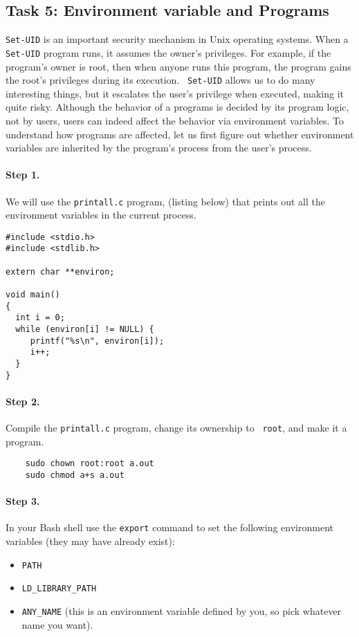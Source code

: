 \subsection{Task 5: Environment variable and \setuid Programs}

{\tt Set-UID} is an important security mechanism in Unix operating systems.
When a {\tt Set-UID} program runs, it assumes the owner's privileges. For
example, if the program's owner is root, then when anyone runs this
program, the program gains the root's privileges during its execution. {\tt
Set-UID} allows us to do many interesting things, but it escalates the
user's privilege when executed, making it quite risky. Although the
behavior of a \setuid programs is decided by its program logic, not by
users, users can indeed affect the behavior via environment variables. 
To understand how \setuid programs are affected, let us first figure out
whether environment variables are inherited by the \setuid program's
process from the user's process.


\paragraph{Step 1.} We will use the {\tt printall.c} program, 
(listing below) that prints out all the environment variables in the current process.

\begin{Verbatim}[frame=single]
#include <stdio.h>
#include <stdlib.h>

extern char **environ;

void main()
{
  int i = 0;
  while (environ[i] != NULL) {
     printf("%s\n", environ[i]);
     i++;
  }
}
\end{Verbatim}


\paragraph{Step 2.} Compile the {\tt printall.c} program, change its ownership to {\tt
root}, and make it a \setuid program. 
\begin{Verbatim}
    sudo chown root:root a.out
    sudo chmod a+s a.out
\end{Verbatim}
\paragraph{Step 3.} In your Bash shell 
use the {\tt export} command to set the
following environment variables (they may have already exist):
\begin{itemize}
\item {\tt PATH}
\item {\tt LD\_LIBRARY\_PATH}
\item {\tt ANY\_NAME} (this is an environment variable defined by you, so
pick whatever name you want).
\end{itemize}


